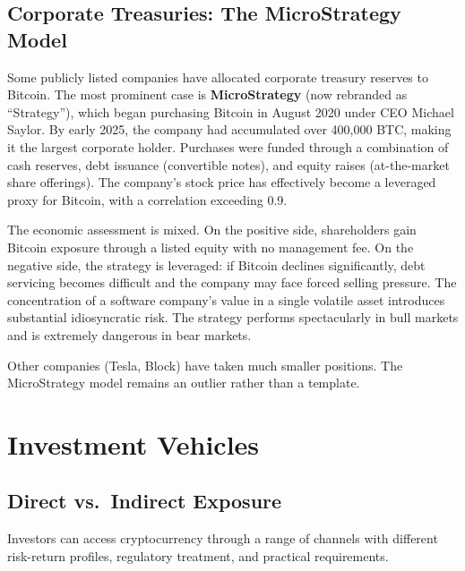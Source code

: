 \documentclass[11pt,a4paper]{article}
\newcommand{\keyword}[1]{\textbf{\textcolor{AccentOrange}{#1}}}
\begin{document}
\subsection{Corporate Treasuries: The MicroStrategy Model}

Some publicly listed companies have allocated corporate treasury reserves to Bitcoin. The most prominent case is \keyword{MicroStrategy} (now rebranded as ``Strategy''), which began purchasing Bitcoin in August 2020 under CEO Michael Saylor. By early 2025, the company had accumulated over 400,000 BTC, making it the largest corporate holder. Purchases were funded through a combination of cash reserves, debt issuance (convertible notes), and equity raises (at-the-market share offerings). The company's stock price has effectively become a leveraged proxy for Bitcoin, with a correlation exceeding 0.9.

The economic assessment is mixed. On the positive side, shareholders gain Bitcoin exposure through a listed equity with no management fee. On the negative side, the strategy is leveraged: if Bitcoin declines significantly, debt servicing becomes difficult and the company may face forced selling pressure. The concentration of a software company's value in a single volatile asset introduces substantial idiosyncratic risk. The strategy performs spectacularly in bull markets and is extremely dangerous in bear markets.

Other companies (Tesla, Block) have taken much smaller positions. The MicroStrategy model remains an outlier rather than a template.

\section{Investment Vehicles}

\subsection{Direct vs.\ Indirect Exposure}

Investors can access cryptocurrency through a range of channels with different risk-return profiles, regulatory treatment, and practical requirements.
\end{document}
